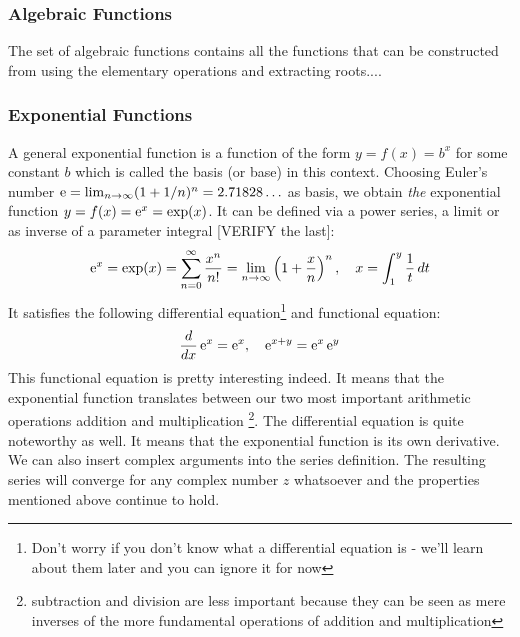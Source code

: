 %






\subsubsection{Algebraic Functions}
The set of algebraic functions contains all the functions that can be constructed from using the elementary operations and extracting roots....








\subsubsection{Exponential Functions}
A general exponential function is a function of the form $y = f(x) = b^x$ for some constant $b$ which is called the basis (or base) in this context. Choosing Euler's number $\operatorname{\mathrm{e}} = \lim_{n \rightarrow \infty} (1 + 1/n)^n = 2.71828\ldots$ as basis, we obtain \emph{the} exponential function $y = f(x) = \operatorname{\mathrm{e}}^x = \exp(x)$. It can be defined via a power series, a limit or as inverse of a parameter integral [VERIFY the last]:
\begin{equation}
\operatorname{\mathrm{e}}^x 
= \exp(x)
= \sum_{n=0}^{\infty} \frac{x^n}{n!}
= \lim_{n \rightarrow \infty} \left( 1 + \frac{x}{n} \right)^n, \quad
x = \int_1^y \frac{1}{t} \, dt
\end{equation}
It satisfies the following differential equation\footnote{Don't worry if you don't know what a differential equation is - we'll learn about them later and you can ignore it for now} and functional equation:
\begin{equation}
\frac{d}{dx} \operatorname{\mathrm{e}}^x = \operatorname{\mathrm{e}}^x, \quad
\operatorname{\mathrm{e}}^{x+y} = \operatorname{\mathrm{e}}^x \operatorname{\mathrm{e}}^y
\end{equation}
This functional equation is pretty interesting indeed. It means that the exponential function translates between our two most important arithmetic operations addition and multiplication \footnote{subtraction and division are less important because they can be seen as mere inverses of the more fundamental operations of addition and multiplication}. The differential equation is quite noteworthy as well. It means that the exponential function is its own derivative. We can also insert complex arguments into the series definition. The resulting series will converge for any complex number $z$ whatsoever and the properties mentioned above continue to hold.

